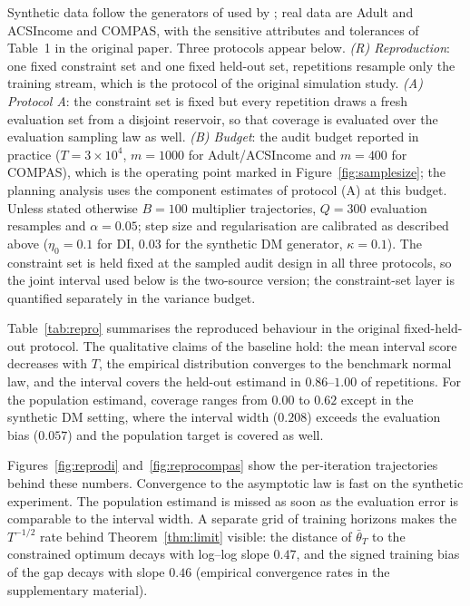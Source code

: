 \documentclass[pdflatex,sn-basic]{sn-jnl}
\newcommand{\tbar}{\bar\theta}
\begin{document}
Synthetic data follow the generators of \citet{zafar2019} used by
\citet{roy2026uq}; real data are Adult and ACSIncome \citep{ding2021} and COMPAS, with the sensitive attributes and tolerances of Table~1 in the original paper.  Three protocols appear below.
\emph{(R) Reproduction}: one fixed constraint set and one fixed held-out set, repetitions resample
only the training stream, which is the protocol of the original simulation study.
\emph{(A) Protocol A}: the constraint set is fixed but every repetition draws a fresh evaluation set
from a disjoint reservoir, so that coverage is evaluated over the evaluation sampling law as well.
\emph{(B) Budget}: the audit budget reported in practice ($T=3\times10^4$, $m=1000$ for
Adult/ACSIncome and $m=400$ for COMPAS), which is the operating point marked in
Figure~\ref{fig:samplesize}; the planning analysis uses the component estimates of protocol (A) at
this budget.  Unless stated otherwise $B=100$ multiplier trajectories, $Q=300$ evaluation resamples and $\alpha=0.05$; step size and regularisation are calibrated as
described above ($\eta_0=0.1$ for DI, $0.03$ for the synthetic DM generator, $\kappa=0.1$).  The
constraint set is held fixed at the sampled audit design in all three protocols, so the joint
interval used below is the two-source version; the constraint-set layer is quantified separately
in the variance budget.


Table~\ref{tab:repro} summarises the reproduced behaviour in the original fixed-held-out protocol.  The
qualitative claims of the baseline hold: the mean interval score decreases with $T$, the empirical distribution converges to the benchmark normal law, and the interval covers the held-out estimand in $0.86$--$1.00$ of repetitions.  For the population estimand, coverage ranges from $0.00$ to $0.62$ except in the synthetic DM setting,
where the interval width ($0.208$) exceeds the evaluation bias ($0.057$) and the population target is
covered as well.

Figures~\ref{fig:reprodi} and~\ref{fig:reprocompas} show the per-iteration
trajectories behind these numbers.  Convergence to the asymptotic law is fast on the synthetic experiment.  The population estimand is missed as soon as the evaluation error is comparable to the interval width.  A separate grid of training horizons makes the $T^{-1/2}$ rate behind Theorem~\ref{thm:limit} visible: the distance of $\tbar_T$ to the constrained optimum decays with log--log slope $0.47$, and the signed training bias of the gap decays with slope $0.46$ (empirical convergence rates in the supplementary material).
\end{document}
